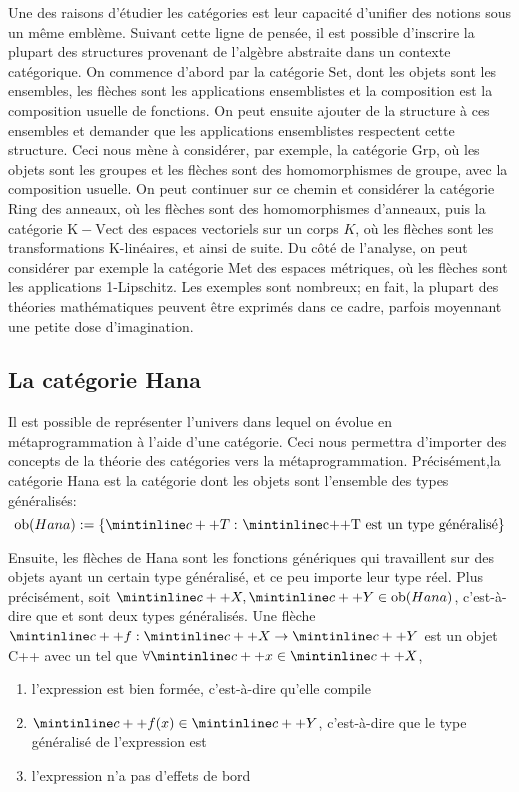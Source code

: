 Une des raisons d'étudier les catégories est leur capacité d'unifier des
notions sous un même emblème. Suivant cette ligne de pensée, il est possible
d'inscrire la plupart des structures provenant de l'algèbre abstraite dans
un contexte catégorique. On commence d'abord par la catégorie $\mathrm{Set}$,
dont les objets sont les ensembles, les flèches sont les applications
ensemblistes et la composition est la composition usuelle de fonctions.
On peut ensuite ajouter de la structure à ces ensembles et demander que
les applications ensemblistes respectent cette structure. Ceci nous mène
à considérer, par exemple, la catégorie $\mathrm{Grp}$, où les objets sont
les groupes et les flèches sont des homomorphismes de groupe, avec la
composition usuelle. On peut continuer sur ce chemin et considérer la
catégorie $\mathrm{Ring}$ des anneaux, où les flèches sont des homomorphismes
d'anneaux, puis la catégorie $\mathrm{K-Vect}$ des espaces vectoriels sur un
corps $K$, où les flèches sont les transformations K-linéaires, et ainsi de
suite. Du côté de l'analyse, on peut considérer par exemple la catégorie
$\mathrm{Met}$ des espaces métriques, où les flèches sont les applications
1-Lipschitz. Les exemples sont nombreux; en fait, la plupart des théories
mathématiques peuvent être exprimés dans ce cadre, parfois moyennant une
petite dose d'imagination.


\subsection{La catégorie Hana}
Il est possible de représenter l'univers dans lequel on évolue en
métaprogrammation à l'aide d'une catégorie. Ceci nous permettra
d'importer des concepts de la théorie des catégories vers la
métaprogrammation. Précisément,la catégorie Hana est la catégorie dont les
objets sont l'ensemble des types généralisés:
\[
    \ob(Hana) := \{ \icpp{T} \, \suchthat \text{\icpp{T} est un type généralisé} \}
\]

Ensuite, les flèches de Hana sont les fonctions génériques qui travaillent sur
des objets ayant un certain type généralisé, et ce peu importe leur type réel.
Plus précisément, soit $\icpp{X}, \icpp{Y} \in \ob(Hana)$, c'est-à-dire que
 et  sont deux types généralisés. Une flèche
$\icpp{f} : \icpp{X} \to \icpp{Y}$ est un objet C++ avec un 
tel que $\forall \icpp{x} \in \icpp{X}$,
\begin{enumerate}
    \item l'expression  est bien formée, c'est-à-dire qu'elle compile
    \item $\icpp{f(x)} \in \icpp{Y}$, c'est-à-dire que le type généralisé de l'expression  est 
    \item l'expression  n'a pas d'effets de bord
\end{enumerate}

